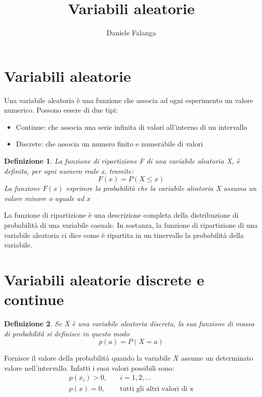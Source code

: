 \documentclass[12pt]{article}
\title{\textbf{Variabili aleatorie}}
\author{Daniele Falanga}
\date{}
\newtheorem{definition}{Definizione}[section]
\begin{document}
\maketitle

\section{Variabili aleatorie}

Una variabile aleatoria è una funzione che associa ad ogni esperimento
un valore numerico. Possono essere di due tipi: 
\begin{itemize}
    \item Continue: che associa una serie infinita di valori all'interno 
    di un intervallo
    \item Discrete: che associa un numero finito e numerabile di valori
\end{itemize}

\begin{definition}
    La funzione di ripartizione F di una variabile aleatoria X, 
    è definita, per ogni numero
    reale x, tramite: 
    \[
    F(x) = P(X \le x)    
    \]
    La funzione \(F(x)\) esprimre la probabilità che la variabile aleatoria X assuma un valore minore o uguale ad \(x\)
\end{definition}

La funzione di ripartizione è una descrizione completa della distribuzione di probabilità di una variabile casuale.
In sostanza, la funzione di ripartizione di una variabile aleatoria ci dice come è 
ripartita in un tinervallo la probabilità della variabile. 

\section{Variabili aleatorie discrete e continue}

\begin{definition}
    Se X è una variabile aleatoria discreta, la sua funzione di massa di probabilità si definisce in questo modo
    \[
    p(a) = P(X = a)    
    \]
\end{definition}

Fornisce il valore della probabilità quando la variabile \(X\) assume un determinato valore
nell'intervallo. Infatti i suoi valori possibili sono:
\begin{align*}
    p(x_i) > 0, & \quad i = 1,2,\dots \\
    p(x) = 0, & \quad \text{tutti gli altri valori di x}
\end{align*}
\end{document}
